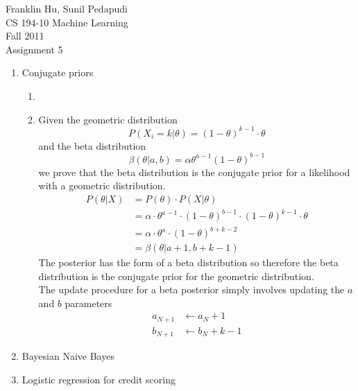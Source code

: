 \documentclass{article}
\begin{document}
Franklin Hu, Sunil Pedapudi \\
CS 194-10 Machine Learning \\
Fall 2011 \\
Assignment 5 \\

\begin{enumerate}
    \item Conjugate priors %
        \begin{enumerate}
            \item %
            \item %
                Given the geometric distribution
                \begin{equation*}
                    P(X_i=k|\theta)= (1-\theta)^{k-1} \cdot \theta
                \end{equation*}
                and the beta distribution
                \begin{equation*}
                    \beta(\theta|a,b)= \alpha \theta^{a-1} (1-\theta)^{b-1}
                \end{equation*}
                we prove that the beta distribution is the conjugate prior
                for a likelihood with a geometric distribution.
                \begin{align*}
                    P(\theta|X)
                    &= P(\theta) \cdot P(X|\theta) \\
                    &= \alpha \cdot \theta^{a-1} \cdot (1-\theta)^{b-1} 
                        \cdot (1-\theta)^{k-1} \cdot \theta \\
                    &= \alpha \cdot \theta^{a} \cdot (1-\theta)^{b+k-2} \\
                    &= \beta(\theta|a+1, b+k-1) 
                \end{align*}
                The posterior has the form of a beta distribution so
                therefore the beta distribution is the conjugate prior for
                the geometric distribution. \\
                The update procedure for a beta posterior simply involves
                updating the \(a\) and \(b\) parameters
                \begin{align*}
                    a_{N+1} &\leftarrow a_N + 1 \\
                    b_{N+1} &\leftarrow b_N + k - 1
                \end{align*}
        \end{enumerate}
    \item Bayesian Naive Bayes %
    \item Logistic regression for credit scoring %
\end{enumerate}
\end{document}
